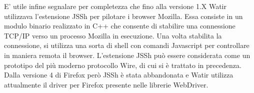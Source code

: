 E' utile infine segnalare per completezza che fino alla versione 1.X Watir utilizzava l'estensione JSSh per pilotare i browser Mozilla. Essa consiste in un modulo binario realizzato in C++ che consente di stabilire una connessione TCP/IP verso un processo Mozilla in esecuzione. Una volta stabilita la connessione, si utilizza una sorta di shell con comandi Javascript per controllare in maniera remota il browser. L'estensione JSSh può essere considerata come un prototipo del più moderno protocollo Wire, di cui si è trattato in precedenza. Dalla versione 4 di Firefox però JSSh è stata abbandonata e Watir utilizza attualmente il driver per Firefox presente nelle librerie WebDriver.






